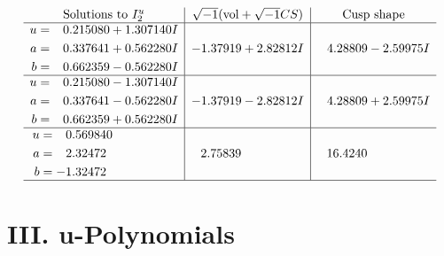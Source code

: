 \documentclass[1p]{elsarticle_modified}
\theoremstyle{definition}
\newcommand{\I}{\sqrt{-1}}
\begin{document}
$$\begin{array}{c|c|c}  
\text{Solutions to }I^u_{2}& \I (\text{vol} + \sqrt{-1}CS) & \text{Cusp shape}\\
 \hline 
\begin{aligned}
u &= \phantom{-}0.215080 + 1.307140 I \\
a &= \phantom{-}0.337641 + 0.562280 I \\
b &= \phantom{-}0.662359 - 0.562280 I\end{aligned}
 & -1.37919 + 2.82812 I & \phantom{-}4.28809 - 2.59975 I \\ \hline\begin{aligned}
u &= \phantom{-}0.215080 - 1.307140 I \\
a &= \phantom{-}0.337641 - 0.562280 I \\
b &= \phantom{-}0.662359 + 0.562280 I\end{aligned}
 & -1.37919 - 2.82812 I & \phantom{-}4.28809 + 2.59975 I \\ \hline\begin{aligned}
u &= \phantom{-}0.569840\phantom{ +0.000000I} \\
a &= \phantom{-}2.32472\phantom{ +0.000000I} \\
b &= -1.32472\phantom{ +0.000000I}\end{aligned}
 & \phantom{-}2.75839\phantom{ +0.000000I} & \phantom{-}16.4240\phantom{ +0.000000I}\\
 \hline 
 \end{array}$$\newpage
\newpage\renewcommand{\arraystretch}{1}
\centering \section*{ III. u-Polynomials}
\end{document}

